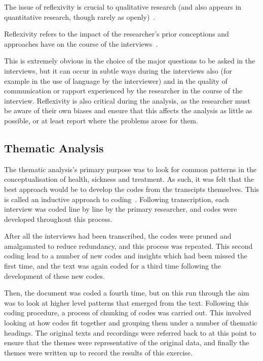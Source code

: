 The issue of reflexivity is crucial to qualitative research (and also appears in quantitative research, though rarely as openly)~\cite{rosenthal1967covert, rosenthal1969interpersonal}.

Reflexivity refers to the impact of the researcher's prior conceptions and approaches have on the course of the interviews~\cite{finlay2002outing}.

This is extremely obvious in the choice of the major questions to be asked in the interviews, but it can occur in subtle ways during the interviews also (for example in the use of language by the interviewer) and in the quality of communication or rapport experienced by the researcher in the course of the interview. Reflexivity is also critical during the analysis, as the researcher must be aware of their own biases and ensure that this affects the analysis as little as possible, or at least report where the problems arose for them.

\subsection{Thematic Analysis}

The thematic analysis's primary purpose was to look for common patterns in the conceptualisation of health, sickness and treatment. As such, it was felt that the best approach would be to develop the codes from the transcipts themselves. 
This is called an inductive approach to coding~\cite{haberman1979analysis}. Following transcription, each interview was coded line by line by the primary researcher, and codes were developed throughout this process.

After all the interviews had been transcribed, the codes were pruned and amalgamated to reduce redundancy, and this process was repeated. This second coding lead to a number of new codes and insights which had been missed the first time, and the text was again coded for a third time following the development of these new codes.

Then, the document was coded a fourth time, but on this run through the aim was to look at higher level patterns that emerged from the text. Following this coding procedure, a process of chunking of codes was carried out. This involved looking at how codes fit together and grouping them under a number of thematic headings. The original texts and recordings were referred back to at this point to ensure that the themes were representative of the original data, and finally the themes were written up to record the results of this exercise.


